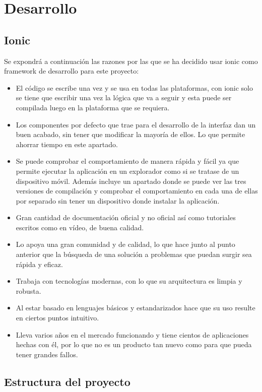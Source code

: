 \section{Desarrollo}
\subsection{Ionic}
Se expondrá a continuación las razones por las que se
ha decidido usar ionic como framework de desarrollo para
este proyecto:

\begin{itemize}
    \item El código se escribe una vez y se usa en todas
    las plataformas, con ionic solo se tiene que escribir
    una vez la lógica que va a seguir y esta puede ser
    compilada luego en la plataforma que se requiera.
    \item Los componentes por defecto que trae para el
    desarrollo de la interfaz dan un buen acabado, sin
    tener que modificar la mayoría de ellos. Lo que permite
    ahorrar tiempo en este apartado.
    \item Se puede comprobar el comportamiento de manera rápida
    y fácil ya que permite ejecutar la aplicación en un
    explorador como si se tratase de un dispositivo móvil.
    Además incluye un apartado donde se puede ver las tres
    versiones de compilación y comprobar el comportamiento
    en cada una de ellas por separado sin tener un dispositivo
    donde instalar la aplicación.
    \item Gran cantidad de documentación oficial y no oficial
    así como tutoriales escritos como en vídeo, de buena calidad.
    \item Lo apoya una gran comunidad y de calidad, lo que hace
    junto al punto anterior que la búsqueda de una solución a
    problemas que puedan surgir sea rápida y eficaz.
    \item Trabaja con tecnologías modernas, con lo que
    su arquitectura es limpia y robusta.
    \item Al estar basado en lenguajes básicos y estandarizados
    hace que su uso resulte en ciertos puntos intuitivo.
    \item Lleva varios años en el mercado funcionando y tiene
    cientos de aplicaciones hechas con él, por lo que no es un
    producto tan nuevo como para que pueda tener grandes fallos.
\end{itemize}

\subsection{Estructura del proyecto}

